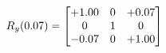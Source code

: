 \documentclass[preview]{standalone}
\begin{document}
\begin{align*}
\special{dvisvgm:raw <g id='unique000'>}R_{y}(0.07) = \begin{bmatrix}+1.00 & 0 & +0.07 \\0 & 1 & 0 \\-0.07 & 0 & +1.00\end{bmatrix}\special{dvisvgm:raw </g>}
\end{align*}
\end{document}
